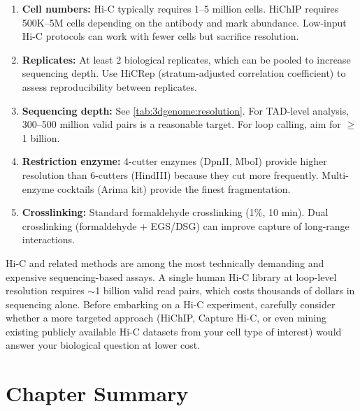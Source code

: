 \begin{enumerate}[itemsep=3pt]
  \item \textbf{Cell numbers:} Hi-C typically requires 1--5 million cells. HiChIP requires 500K--5M cells depending on the antibody and mark abundance. Low-input Hi-C protocols can work with fewer cells but sacrifice resolution.
  \item \textbf{Replicates:} At least 2 biological replicates, which can be pooled to increase sequencing depth. Use HiCRep (stratum-adjusted correlation coefficient) to assess reproducibility between replicates.
  \item \textbf{Sequencing depth:} See \cref{tab:3dgenome:resolution}. For TAD-level analysis, 300--500 million valid pairs is a reasonable target. For loop calling, aim for $\geq$ 1 billion.
  \item \textbf{Restriction enzyme:} 4-cutter enzymes (DpnII, MboI) provide higher resolution than 6-cutters (HindIII) because they cut more frequently. Multi-enzyme cocktails (Arima kit) provide the finest fragmentation.
  \item \textbf{Crosslinking:} Standard formaldehyde crosslinking (1\%, 10 min). Dual crosslinking (formaldehyde + EGS/DSG) can improve capture of long-range interactions.
\end{enumerate}

\begin{warningbox}
Hi-C and related methods are among the most technically demanding and expensive sequencing-based assays. A single human Hi-C library at loop-level resolution requires $\sim$1 billion valid read pairs, which costs thousands of dollars in sequencing alone. Before embarking on a Hi-C experiment, carefully consider whether a more targeted approach (HiChIP, Capture Hi-C, or even mining existing publicly available Hi-C datasets from your cell type of interest) would answer your biological question at lower cost.
\end{warningbox}

\section{Chapter Summary}
\label{sec:3dgenome:summary}

